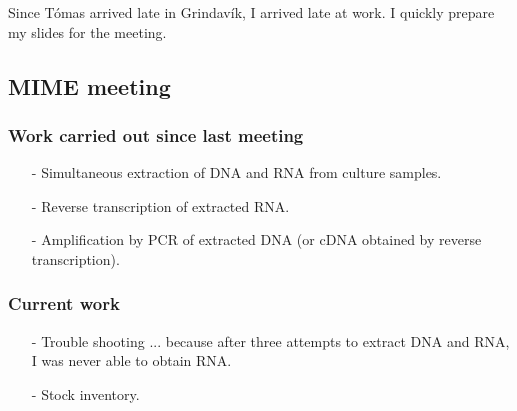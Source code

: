 
Since Tómas arrived late in Grindavík, I arrived late at work. I quickly prepare my slides for the meeting.

\subsection{MIME meeting}
\label{task:20180122_cj0}

\subsubsection{Work carried out since last meeting}
\begin{itemize}
    \item[-] Simultaneous extraction of DNA and RNA from culture samples.
    \item[-] Reverse transcription of extracted RNA.
    \item[-] Amplification by PCR of extracted DNA (or cDNA obtained by reverse transcription).
\end{itemize}

\subsubsection{Current work}
\begin{itemize}
    \item[-] Trouble shooting ... because after three attempts to extract DNA and RNA, I was never able to obtain RNA.
    \item[-] Stock inventory.
\end{itemize}

